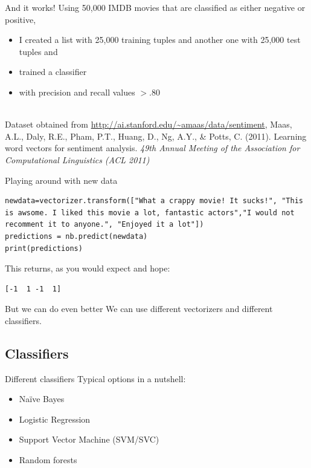 \begin{frame}{And it works!}
	Using 50,000 IMDB movies that are classified as either negative or positive,
	\begin{itemize}
		\item I created a list with 25,000 training tuples and another one with 25,000 test tuples and
		\item trained a classifier
		\item with precision and recall values $>.80$
	\end{itemize}
	~\\
	\tiny{Dataset obtained from \url{http://ai.stanford.edu/~amaas/data/sentiment}, Maas, A.L., Daly, R.E., Pham, P.T., Huang, D., Ng, A.Y., \& Potts, C. (2011). Learning word vectors for sentiment analysis. \emph{49th Annual Meeting of the Association for Computational Linguistics (ACL 2011)}
	}
	
\end{frame}

\begin{frame}[fragile]{Playing around with new data}
	\begin{verbatim}
newdata=vectorizer.transform(["What a crappy movie! It sucks!", "This is awsome. I liked this movie a lot, fantastic actors","I would not recomment it to anyone.", "Enjoyed it a lot"])
predictions = nb.predict(newdata)
print(predictions)
	\end{verbatim}
	This returns, as you would expect and hope:
	\begin{lstlisting} 
[-1  1 -1  1]
	\end{lstlisting}
	
	
\end{frame}

\begin{frame}{But we can do even better}
	We can use different vectorizers and different classifiers.
\end{frame}


\subsection{Classifiers}


\begin{frame}{Different classifiers}
	Typical options in a nutshell:
	\begin{itemize}
		\item Na\"ive Bayes
		\item Logistic Regression
		\item Support Vector Machine (SVM/SVC)
		\item Random forests
	\end{itemize}
\end{frame}





